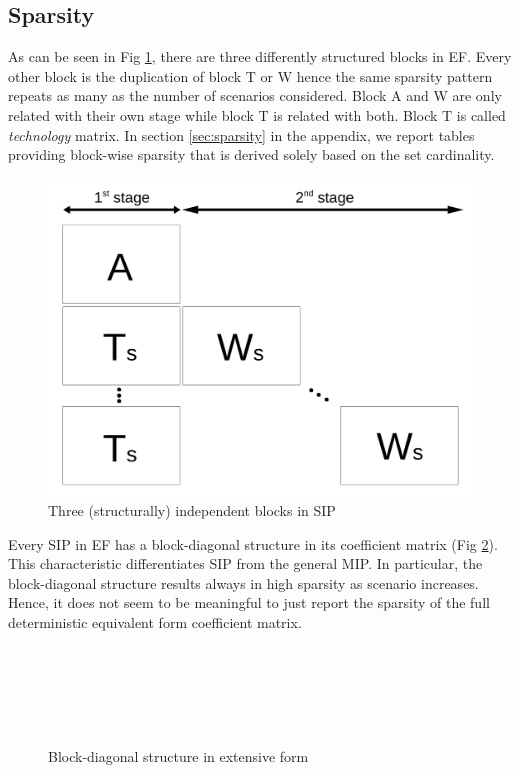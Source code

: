 \subsection{Sparsity} \label{subsec:sparsity}
As can be seen in Fig \ref{fig:stagewise_sparsity}, there are three differently structured blocks in EF. Every other block is the duplication of block T or W hence the same sparsity pattern repeats as many as the number of scenarios considered. Block A and W are only related with their own stage while block T is related with both. Block T is called \textit{technology}  matrix. In section \ref{sec:sparsity} in the appendix, we report tables providing block-wise sparsity that is derived solely based on the set cardinality.
\begin{figure}
	\centering
	\includegraphics[width=0.7\linewidth]{drawings/stagewise_sparsity}
	\caption{Three (structurally) independent blocks in SIP}
	\label{fig:stagewise_sparsity}
\end{figure}

Every SIP in EF has a block-diagonal structure in its coefficient matrix (Fig \ref{fig:de_structure}). This characteristic differentiates SIP from the general MIP. In particular, the block-diagonal structure results always in high sparsity as scenario increases. Hence, it does not seem to be meaningful to just report the sparsity of the full deterministic equivalent form coefficient matrix.
\begin{figure}[]
	\centering
	~
	
	~
	
	~
	
	\caption{Block-diagonal structure in extensive form}
	\label{fig:de_structure}
\end{figure}

